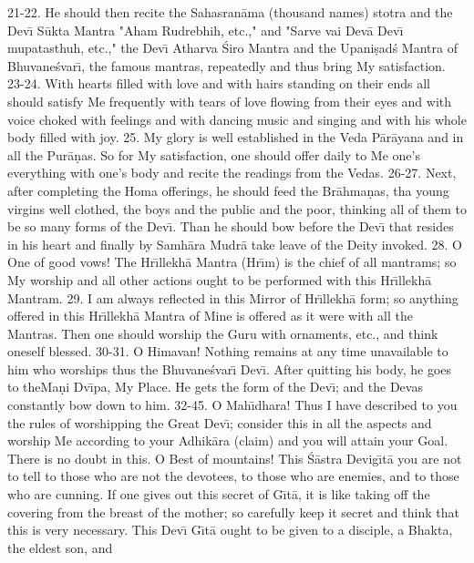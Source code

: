 21-22. He should then recite the Sahasran\=ama (thousand names) stotra and the Dev\={\i} S\=ukta Mantra "Aham Rudrebhih, etc.," and "Sarve vai Dev\=a Dev\={\i} mupatasthuh, etc.," the Dev\={\i} Atharva \'Siro Mantra and the Upani\d{s}ad\'s Mantra of Bhuvane\'svar\={\i}, the famous mantras, repeatedly and thus bring My satisfaction.
23-24. With hearts filled with love and with hairs standing on their ends all should satisfy Me frequently with tears of love flowing from their eyes and with voice choked with feelings and with dancing music and singing and with his whole body filled with joy.
25. My glory is well established in the Veda P\=ar\=ayana and in all the Pur\=a\d{n}as. So for My satisfaction, one should offer daily to Me one's everything with one's body and recite the readings from the Vedas.
26-27. Next, after completing the Homa offerings, he should feed the Br\=ahma\d{n}as, tha young virgins well clothed, the boys and the public and the poor, thinking all of them to be so many forms of the Dev\={\i}. Than he should bow before the Dev\={\i} that resides in his heart and finally by Samh\=ara Mudr\=a take leave of the Deity invoked.
28. O One of good vows! The Hr\={\i}llekh\=a Mantra (Hr\={\i}m) is the chief of all mantrams; so My worship and all other actions ought to be performed with this Hr\={\i}llekh\=a Mantram.
29. I am always reflected in this Mirror of Hr\={\i}llekh\=a form; so anything offered in this Hr\={\i}llekh\=a Mantra of Mine is offered as it were with all the Mantras. Then one should worship the Guru with ornaments, etc., and think oneself blessed.
30-31. O Himavan! Nothing remains at any time unavailable to him who worships thus the Bhuvane\'svar\={\i} Dev\={\i}. After quitting his body, he goes to theMa\d{n}i Dv\={\i}pa, My Place. He gets the form of the Dev\={\i}; and the Devas constantly bow down to him.
32-45. O Mah\={\i}dhara! Thus I have described to you the rules of worshipping the Great Dev\={\i}; consider this in all the aspects and worship Me according to your Adhik\=ara (claim) and you will attain your Goal. There is no doubt in this. O Best of mountains! This \'S\=astra Devig\={\i}t\=a you are not to tell to those who are not the devotees, to those who are enemies, and to those who are cunning. If one gives out this secret of G\={\i}t\=a, it is like taking off the covering from the breast of the mother; so carefully keep it secret and think that this is very necessary. This Dev\={\i} G\={\i}t\=a ought to be given to a disciple, a Bhakta, the eldest son, and

